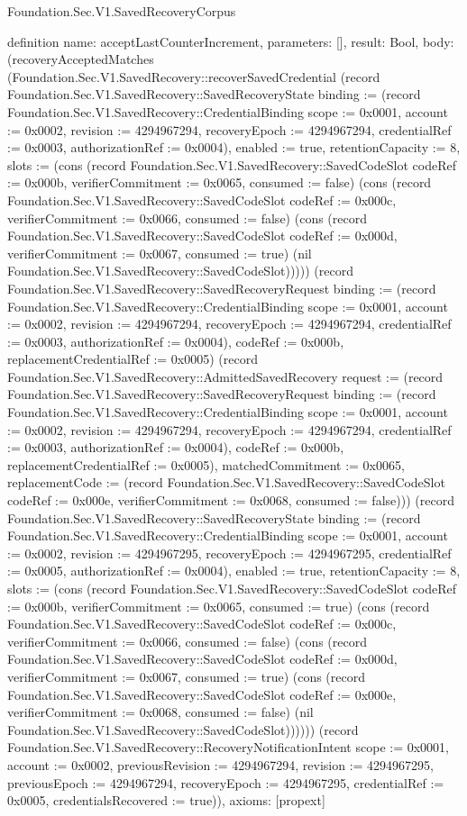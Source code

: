 \begin{lexlean}{Foundation.Sec.V1.SavedRecoveryCorpus}
\begin{semanticmodule}
definition{
  name: acceptLastCounterIncrement,
  parameters: [],
  result: Bool,
  body: (recoveryAcceptedMatches (Foundation.Sec.V1.SavedRecovery::recoverSavedCredential (record Foundation.Sec.V1.SavedRecovery::SavedRecoveryState {binding := (record Foundation.Sec.V1.SavedRecovery::CredentialBinding {scope := 0x0001, account := 0x0002, revision := 4294967294, recoveryEpoch := 4294967294, credentialRef := 0x0003, authorizationRef := 0x0004}), enabled := true, retentionCapacity := 8, slots := (cons (record Foundation.Sec.V1.SavedRecovery::SavedCodeSlot {codeRef := 0x000b, verifierCommitment := 0x0065, consumed := false}) (cons (record Foundation.Sec.V1.SavedRecovery::SavedCodeSlot {codeRef := 0x000c, verifierCommitment := 0x0066, consumed := false}) (cons (record Foundation.Sec.V1.SavedRecovery::SavedCodeSlot {codeRef := 0x000d, verifierCommitment := 0x0067, consumed := true}) (nil Foundation.Sec.V1.SavedRecovery::SavedCodeSlot))))}) (record Foundation.Sec.V1.SavedRecovery::SavedRecoveryRequest {binding := (record Foundation.Sec.V1.SavedRecovery::CredentialBinding {scope := 0x0001, account := 0x0002, revision := 4294967294, recoveryEpoch := 4294967294, credentialRef := 0x0003, authorizationRef := 0x0004}), codeRef := 0x000b, replacementCredentialRef := 0x0005}) (record Foundation.Sec.V1.SavedRecovery::AdmittedSavedRecovery {request := (record Foundation.Sec.V1.SavedRecovery::SavedRecoveryRequest {binding := (record Foundation.Sec.V1.SavedRecovery::CredentialBinding {scope := 0x0001, account := 0x0002, revision := 4294967294, recoveryEpoch := 4294967294, credentialRef := 0x0003, authorizationRef := 0x0004}), codeRef := 0x000b, replacementCredentialRef := 0x0005}), matchedCommitment := 0x0065, replacementCode := (record Foundation.Sec.V1.SavedRecovery::SavedCodeSlot {codeRef := 0x000e, verifierCommitment := 0x0068, consumed := false})})) (record Foundation.Sec.V1.SavedRecovery::SavedRecoveryState {binding := (record Foundation.Sec.V1.SavedRecovery::CredentialBinding {scope := 0x0001, account := 0x0002, revision := 4294967295, recoveryEpoch := 4294967295, credentialRef := 0x0005, authorizationRef := 0x0004}), enabled := true, retentionCapacity := 8, slots := (cons (record Foundation.Sec.V1.SavedRecovery::SavedCodeSlot {codeRef := 0x000b, verifierCommitment := 0x0065, consumed := true}) (cons (record Foundation.Sec.V1.SavedRecovery::SavedCodeSlot {codeRef := 0x000c, verifierCommitment := 0x0066, consumed := false}) (cons (record Foundation.Sec.V1.SavedRecovery::SavedCodeSlot {codeRef := 0x000d, verifierCommitment := 0x0067, consumed := true}) (cons (record Foundation.Sec.V1.SavedRecovery::SavedCodeSlot {codeRef := 0x000e, verifierCommitment := 0x0068, consumed := false}) (nil Foundation.Sec.V1.SavedRecovery::SavedCodeSlot)))))}) (record Foundation.Sec.V1.SavedRecovery::RecoveryNotificationIntent {scope := 0x0001, account := 0x0002, previousRevision := 4294967294, revision := 4294967295, previousEpoch := 4294967294, recoveryEpoch := 4294967295, credentialRef := 0x0005, credentialsRecovered := true})),
  axioms: [propext]
}


\end{semanticmodule}
\end{lexlean}
